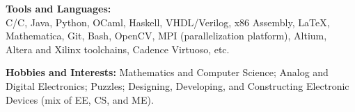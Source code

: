 \documentclass{article}
\newenvironment{changemargin}[2]{%
  \begin{list}{}{%
    \setlength{\topsep}{0pt}%
    \setlength{\leftmargin}{#1}%
    \setlength{\rightmargin}{#2}%
    \setlength{\listparindent}{\parindent}%
    \setlength{\itemindent}{\parindent}%
    \setlength{\parsep}{\parskip}%
  }%
  \item[]}{\end{list}
}
\newenvironment{body} {
	\vspace*{-16pt}
	\begin{changemargin}{-0.25in}{-0.5in}
  }	
	{\end{changemargin}
}
\newcommand{\CC}{C\nolinebreak\hspace{-.05em}\raisebox{.4ex}{\tiny\bf +}\nolinebreak\hspace{-.10em}\raisebox{.4ex}{\tiny\bf +}}
\begin{document}
\begin{body}
	\vspace{14pt}
	\textbf{Tools and Languages:} \\
	C/\CC, Java, Python, OCaml, Haskell, VHDL/Verilog, x86 Assembly, \LaTeX, Mathematica, Git, Bash, OpenCV, MPI (parallelization platform), Altium, Altera and Xilinx toolchains, Cadence Virtuoso, etc. \\
	
	\medskip
	
	\textbf{Hobbies and Interests:} Mathematics and Computer Science; Analog and Digital Electronics; Puzzles; Designing, Developing, and Constructing Electronic Devices (mix of EE, CS, and ME). \\
\end{body}

\smallskip
\end{document}
